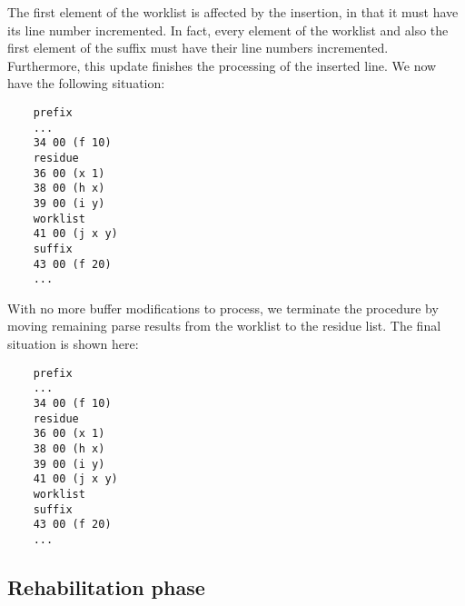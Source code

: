 The first element of the worklist is affected by the insertion, in
that it must have its line number incremented.  In fact, every element
of the worklist and also the first element of the suffix must have
their line numbers incremented.  Furthermore, this update finishes the
processing of the inserted line.  We now have the following situation:

\vspace{-5mm}
{\small\begin{verbatim}
    prefix
    ...
    34 00 (f 10)
    residue
    36 00 (x 1)
    38 00 (h x)
    39 00 (i y)
    worklist
    41 00 (j x y)
    suffix
    43 00 (f 20)
    ...
\end{verbatim}}
\vspace{-5mm}

With no more buffer modifications to process, we terminate the
procedure by moving remaining parse results from the worklist to the
residue list.  The final situation is shown here:

\vspace{-5mm}
{\small\begin{verbatim}
    prefix
    ...
    34 00 (f 10)
    residue
    36 00 (x 1)
    38 00 (h x)
    39 00 (i y)
    41 00 (j x y)
    worklist
    suffix
    43 00 (f 20)
    ...
\end{verbatim}}
\vspace{-5mm}

\subsection{Rehabilitation phase}

